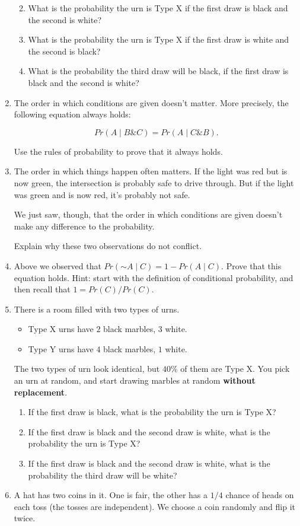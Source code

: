 \documentclass[justified]{tufte-book}
\providecommand{\tightlist}{%
  \setlength{\itemsep}{0pt}\setlength{\parskip}{0pt}}
\newcommand{\given}{\mid}
\renewcommand{\neg}{\mathbin{\sim}}
\renewcommand{\wedge}{\mathbin{\&}}
\newcommand{\p}{Pr}
\theoremstyle{definition}
\theoremstyle{definition}
\theoremstyle{definition}
\theoremstyle{definition}
\theoremstyle{remark}
\begin{document}
\begin{enumerate}
  \begin{enumerate}
  \def\labelenumii{\alph{enumii}.}
  \tightlist
  \item
    What is the probability the urn is Type X if the first draw is black and the second is white?
  \item
    What is the probability the urn is Type X if the first draw is white and the second is black?
  \item
    What is the probability the third draw will be black, if the first draw is black and the second is white?
  \end{enumerate}
\item
  The order in which conditions are given doesn't matter. More precisely, the following equation always holds:

  \[ \p(A \given B \wedge C) = \p(A \given C \wedge B).\]

  Use the rules of probability to prove that it always holds.
\item
  The order in which things happen often matters. If the light was red but is now green, the intersection is probably safe to drive through. But if the light was green and is now red, it's probably not safe.

  We just saw, though, that the order in which conditions are given doesn't make any difference to the probability.

  Explain why these two observations do not conflict.
\item
  Above we observed that \(\p(\neg A \given C) = 1 - \p(A \given C)\). Prove that this equation holds. Hint: start with the definition of conditional probability, and then recall that \(1 = \p(C) / \p(C)\).
\item
  There is a room filled with two types of urns.

  \begin{itemize}
  \tightlist
  \item
    Type X urns have \(2\) black marbles, \(3\) white.
  \item
    Type Y urns have \(4\) black marbles, \(1\) white.
  \end{itemize}

  The two types of urn look identical, but \(40\%\) of them are Type X. You pick an urn at random, and start drawing marbles at random \textbf{without replacement}.

  \begin{enumerate}
  \def\labelenumii{\alph{enumii}.}
  \tightlist
  \item
    If the first draw is black, what is the probability the urn is Type X?
  \item
    If the first draw is black and the second draw is white, what is the probability the urn is Type X?
  \item
    If the first draw is black and the second draw is white, what is the probability the third draw will be white?
  \end{enumerate}
\item
  A hat has two coins in it. One is fair, the other has a \(1/4\) chance of heads on each toss (the tosses are independent). We choose a coin randomly and flip it twice.


\end{enumerate}
\end{document}
